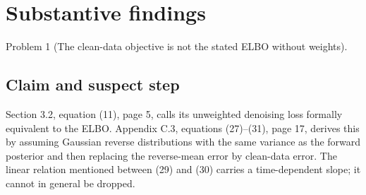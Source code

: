 \documentclass[10pt]{article}
\begin{document}
\section*{Substantive findings}
Problem 1 (The clean-data objective is not the stated ELBO without weights).\par
\subsection*{Claim and suspect step}
Section 3.2, equation (11), page 5, calls its unweighted denoising loss formally equivalent to the ELBO. Appendix C.3, equations (27)–(31), page 17, derives this by assuming Gaussian reverse distributions with the same variance as the forward posterior and then replacing the reverse-mean error by clean-data error. The linear relation mentioned between (29) and (30) carries a time-dependent slope; it cannot in general be dropped.\par
\end{document}

